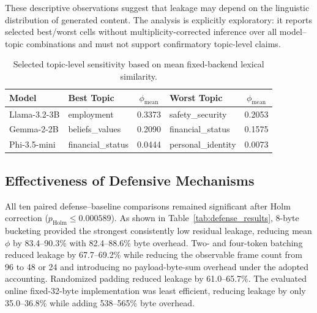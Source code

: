 \documentclass[journal,article,submit,pdftex,moreauthors]{Definitions/mdpi}
\begin{document}
These descriptive observations suggest that leakage may depend on the linguistic distribution of generated content. The analysis is explicitly exploratory: it reports selected best/worst cells without multiplicity-corrected inference over all model--topic combinations and must not support confirmatory topic-level claims.

\begin{table}[ht]
\centering
\caption{Selected topic-level sensitivity based on mean fixed-backend lexical similarity.}
\label{tab:topic_sensitivity}
\begin{tabular}{l l c l c}
\toprule
Model & Best Topic & $\phi_{\mathrm{mean}}$ & Worst Topic & $\phi_{\mathrm{mean}}$ \\
\midrule
Llama-3.2-3B & employment & 0.3373 & safety\_security & 0.2053 \\
Gemma-2-2B & beliefs\_values & 0.2090 & financial\_status & 0.1575 \\
Phi-3.5-mini & financial\_status & 0.0444 & personal\_identity & 0.0073 \\
\bottomrule
\end{tabular}
\end{table}

\subsection{Effectiveness of Defensive Mechanisms}\label{sec:defense}
All ten paired defense--baseline comparisons remained significant after Holm correction ($p_{\mathrm{Holm}}\leq0.000589$). As shown in Table~\ref{tab:defense_results}, 8-byte bucketing provided the strongest consistently low residual leakage, reducing mean $\phi$ by 83.4--90.3\% with 82.4--88.6\% byte overhead. Two- and four-token batching reduced leakage by 67.7--69.2\% while reducing the observable frame count from 96 to 48 or 24 and introducing no payload-byte-sum overhead under the adopted accounting. Randomized padding reduced leakage by 61.0--65.7\%. The evaluated online fixed-32-byte implementation was least efficient, reducing leakage by only 35.0--36.8\% while adding 538--565\% byte overhead.
\end{document}
